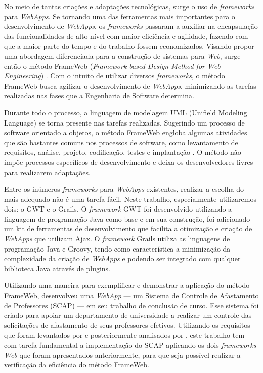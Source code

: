 No meio de tantas criações e adaptações tecnológicas, surge o uso de \textit{frameworks} para \textit{WebApps}. Se tornando uma das ferramentas mais importantes para o desenvolvimento de \textit{WebApps}, os \textit{frameworks} passaram a auxiliar na encapsulação das funcionalidades de alto nível com maior eficiência e agilidade, fazendo com que a maior parte do tempo e do trabalho fossem economizados. Visando propor uma abordagem diferenciada para a construção de sistemas para \textit{Web}, surge então o método FrameWeb (\textit{Framework-based Design Method for Web Engineering}) \cite{souza:masterthesis07}. Com o intuito de utilizar diversos \textit{frameworks}, o método FrameWeb busca agilizar o desenvolvimento de \textit{WebApps}, minimizando as tarefas realizadas nas fases que a Engenharia de Software determina.

Durante todo o processo, a linguagem de modelagem UML (Unifield Modeling Language) \cite{booch-et-al:u06} se torna presente nas tarefas realizadas. Sugerindo um processo de software orientado a objetos, o método FrameWeb engloba algumas atividades que são bastantes comuns nos processos de software, como levantamento de requisitos, análise, projeto, codificação, testes e implantação \cite{souza:masterthesis07}. O método não impõe processos específicos de desenvolvimento e deixa os desenvolvedores livres para realizarem adaptações.

Entre os inúmeros \textit{frameworks} para \textit{WebApps} existentes, realizar a escolha do mais adequado não é uma tarefa fácil. Neste trabalho, especialmente utilizaremos dois: o GWT e o Grails. O \textit{framework} GWT foi desenvolvido utilizando a linguagem de programação Java como base e em sua construção, foi adicionado um kit de ferramentas de desenvolvimento que facilita a otimização e criação de \textit{WebApps} que utilizam Ajax. O \textit{framework} Grails utiliza as linguagens de programação Java e Groovy, tendo como característica a minimização da complexidade da criação de \textit{WebApps} e podendo ser integrado com qualquer biblioteca Java através de plugins.

Utilizando uma maneira para exemplificar e demonstrar a aplicação do método FrameWeb,  desenvolveu uma \textit{WebApp} --- um Sistema de Controle de Afastamento de Professores (SCAP) --- em seu trabalho de conclusão de curso. Esse sistema foi criado para apoiar um departamento de universidade a realizar um controle das solicitações de afastamento de seus professores efetivos. Utilizando os requisitos que foram levantados por  e posteriormente analisados por , este trabalho tem com tarefa fundamental a implementação do SCAP aplicando os dois \textit{frameworks Web} que foram apresentados anteriormente, para que seja possível realizar a verificação da eficiência do método FrameWeb.